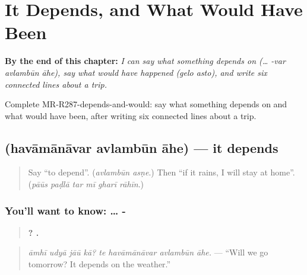 
\chapter{It Depends, and What Would Have Been}
\label{ch:mr-it-depends-and-what-would-have-been}

\begin{chapteropening}
\textbf{By the end of this chapter:} \emph{I can say what something depends on (… -var avlambūn āhe), say what would have happened (gelo asto), and write six connected lines about a trip.}

Complete MR-R287-depends-and-would: say what something depends on and what would have been, after writing six connected lines about a trip.
\end{chapteropening}

\section[\texorpdfstring{\mr{हवामानावर} \mr{अवलंबून} \mr{आहे} (havāmānāvar …)}{हवामानावर अवलंबून आहे (havāmānāvar …)}]{   (havāmānāvar avlambūn āhe) — it depends}

\label{lesson:MR-C287-avlambun-ahe}



\begin{quote}
Say \textquotedblleft{}to depend\textquotedblright{}. (\emph{avlambūn asṇe}.) Then \textquotedblleft{}if it rains, I will stay at home\textquotedblright{}. (\emph{pāūs paḍlā tar mī gharī rāhīn}.)
\end{quote}

\subsection*{You'll want to know: … -  }
\begin{quote}
\textbf{   ?    .}
\end{quote}

\begin{quote}
\emph{āmhī udyā jāū kā? te havāmānāvar avlambūn āhe.} — \textquotedblleft{}Will we go tomorrow? It depends on the weather.\textquotedblright{}
\end{quote}

